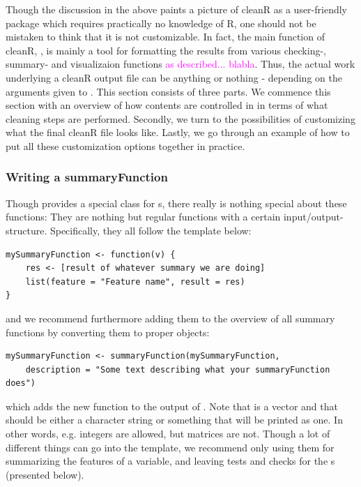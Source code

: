 \documentclass[article]{jss}
\newcommand{\hl}[1]{\textcolor{magenta}{#1}}
\begin{document}
Though the discussion in the above paints a picture of cleanR as a user-friendly package which requires practically no knowledge of R, one should not be mistaken to think that it is not customizable. In fact, the main function of cleanR, , is mainly a tool for formatting the results from various checking-, summary- and visualizaion functions \hl{as described... blabla}. Thus, the actual work underlying a cleanR output file can be anything or nothing - depending on the arguments given to . This section consists of three parts. We commence this section with an overview of how contents are controlled in  in terms of what cleaning steps are performed. Secondly, we turn to the possibilities of customizing what the final cleanR file looks like. Lastly, we go through an example of how to put all these customization options together in practice.

\subsubsection{Writing a summaryFunction}
Though  provides a special class for s, there really is nothing special about these functions: They are nothing but regular functions with a certain input/output-structure. Specifically, they all follow the template below:
\begin{Verbatim}
mySummaryFunction <- function(v) {
	res <- [result of whatever summary we are doing]
	list(feature = "Feature name", result = res)
}
\end{Verbatim}
and we recommend furthermore adding them to the overview of all summary functions by converting them to proper  objects:
\begin{Verbatim}
mySummaryFunction <- summaryFunction(mySummaryFunction,
	description = "Some text describing what your summaryFunction does")
\end{Verbatim}
which adds the new function to the output of . Note that  is a vector and that  should be either a character string or something that will be printed as one. In other words, e.g. integers are allowed, but matrices are not. Though a lot of different things can go into the  template, we recommend only using them for summarizing the features of a variable, and leaving tests and checks for the s (presented below).
\end{document}
